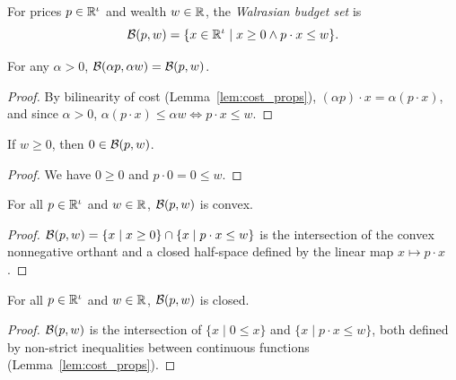 \begin{definition}
\label{def:budgetSet}
\leanok
{}
For prices $p \in \mathbb{R}^\iota$ and wealth $w \in \mathbb{R}$, the \emph{Walrasian budget set} is
\[
  \mathcal{B}(p, w) = \{x \in \mathbb{R}^\iota \mid x \ge 0 \land p \cdot x \le w\}.
\]
\end{definition}

\begin{proposition}
\label{thm:budgetSet_smul}
\leanok
{}
For any $\alpha > 0$, $\mathcal{B}(\alpha p, \alpha w) = \mathcal{B}(p, w)$.
\end{proposition}
\begin{proof}
\leanok
By bilinearity of cost (Lemma~\ref{lem:cost_props}), $(\alpha p) \cdot x = \alpha(p \cdot x)$,
and since $\alpha > 0$, $\alpha(p \cdot x) \le \alpha w \iff p \cdot x \le w$.
\end{proof}

\begin{lemma}
\label{lem:zero_mem_budgetSet}
\leanok
{}
If $w \ge 0$, then $0 \in \mathcal{B}(p, w)$.
\end{lemma}
\begin{proof}
\leanok
We have $0 \ge 0$ and $p \cdot 0 = 0 \le w$.
\end{proof}

\begin{proposition}
\label{thm:convex_budgetSet}
\leanok
{}
For all $p \in \mathbb{R}^\iota$ and $w \in \mathbb{R}$, $\mathcal{B}(p, w)$ is convex.
\end{proposition}
\begin{proof}
\leanok
$\mathcal{B}(p, w) = \{x \mid x \ge 0\} \cap \{x \mid p \cdot x \le w\}$ is the intersection of
the convex nonnegative orthant and a closed half-space defined by the linear map
$x \mapsto p \cdot x$.
\end{proof}

\begin{proposition}
\label{thm:isClosed_budgetSet}
\leanok
{}
For all $p \in \mathbb{R}^\iota$ and $w \in \mathbb{R}$, $\mathcal{B}(p, w)$ is closed.
\end{proposition}
\begin{proof}
\leanok
$\mathcal{B}(p, w)$ is the intersection of $\{x \mid 0 \le x\}$ and $\{x \mid p \cdot x \le w\}$,
both defined by non-strict inequalities between continuous functions (Lemma~\ref{lem:cost_props}).
\end{proof}

